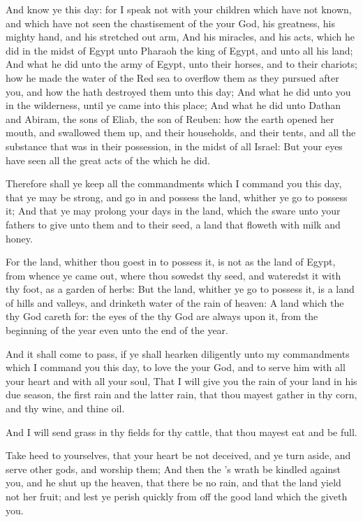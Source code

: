 \Verse And know ye this day: for I speak not with your children which have not known, and which have not seen the chastisement of the \LORD your God, his greatness, his mighty hand, and his stretched out arm, \Verse And his miracles, and his acts, which he did in the midst of Egypt unto Pharaoh the king of Egypt, and unto all his land; \Verse And what he did unto the army of Egypt, unto their horses, and to their chariots; how he made the water of the Red sea to overflow them as they pursued after you, and how the \LORD hath destroyed them unto this day; \Verse And what he did unto you in the wilderness, until ye came into this place; \Verse And what he did unto Dathan and Abiram, the sons of Eliab, the son of Reuben: how the earth opened her mouth, and swallowed them up, and their households, and their tents, and all the substance that was in their possession, in the midst of all Israel: \Verse But your eyes have seen all the great acts of the \LORD which he did.

\Verse Therefore shall ye keep all the commandments which I command you this day, that ye may be strong, and go in and possess the land, whither ye go to possess it; \Verse And that ye may prolong your days in the land, which the \LORD sware unto your fathers to give unto them and to their seed, a land that floweth with milk and honey.

\Verse For the land, whither thou goest in to possess it, is not as the land of Egypt, from whence ye came out, where thou sowedst thy seed, and wateredst it with thy foot, as a garden of herbs: \Verse But the land, whither ye go to possess it, is a land of hills and valleys, and drinketh water of the rain of heaven: \Verse A land which the \LORD thy God careth for: the eyes of the \LORD thy God are always upon it, from the beginning of the year even unto the end of the year.

\Verse And it shall come to pass, if ye shall hearken diligently unto my commandments which I command you this day, to love the \LORD your God, and to serve him with all your heart and with all your soul, \Verse That I will give you the rain of your land in his due season, the first rain and the latter rain, that thou mayest gather in thy corn, and thy wine, and thine oil.

\Verse And I will send grass in thy fields for thy cattle, that thou mayest eat and be full.

\Verse Take heed to yourselves, that your heart be not deceived, and ye turn aside, and serve other gods, and worship them; \Verse And then the \LORD's wrath be kindled against you, and he shut up the heaven, that there be no rain, and that the land yield not her fruit; and lest ye perish quickly from off the good land which the \LORD giveth you.

